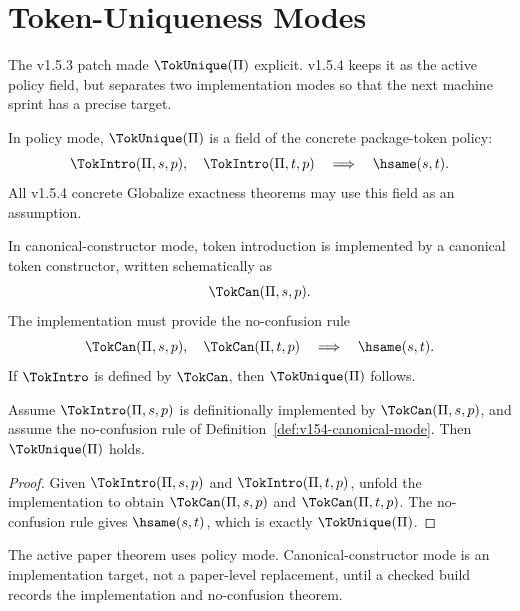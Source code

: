 
\chapter{Token-Uniqueness Modes}
\label{ch:v154-token-uniqueness-modes}

The v1.5.3 patch made \(\TokUnique(\Pi)\) explicit. v1.5.4 keeps it as the active policy field, but separates two implementation modes so that the next machine sprint has a precise target.

\begin{definition}
\label{def:v154-policy-mode}
In policy mode, \(\TokUnique(\Pi)\) is a field of the concrete package-token policy:
\[
  \TokIntro(\Pi,s,p),\quad \TokIntro(\Pi,t,p)
  \quad\Longrightarrow\quad
  \hsame(s,t).
\]
All v1.5.4 concrete Globalize exactness theorems may use this field as an assumption.
\end{definition}

\begin{definition}
\label{def:v154-canonical-mode}
In canonical-constructor mode, token introduction is implemented by a canonical token constructor, written schematically as
\[
  \TokCan(\Pi,s,p).
\]
The implementation must provide the no-confusion rule
\[
  \TokCan(\Pi,s,p),\quad \TokCan(\Pi,t,p)
  \quad\Longrightarrow\quad
  \hsame(s,t).
\]
If \(\TokIntro\) is defined by \(\TokCan\), then \(\TokUnique(\Pi)\) follows.
\end{definition}

\begin{lemma}
\label{lem:v154-canonical-implies-unique}
Assume \(\TokIntro(\Pi,s,p)\) is definitionally implemented by \(\TokCan(\Pi,s,p)\), and assume the no-confusion rule of Definition~\ref{def:v154-canonical-mode}. Then \(\TokUnique(\Pi)\) holds.
\end{lemma}

\begin{proof}
Given \(\TokIntro(\Pi,s,p)\) and \(\TokIntro(\Pi,t,p)\), unfold the implementation to obtain \(\TokCan(\Pi,s,p)\) and \(\TokCan(\Pi,t,p)\). The no-confusion rule gives \(\hsame(s,t)\), which is exactly \(\TokUnique(\Pi)\).
\end{proof}

\begin{principle}
\label{prin:v154-active-token-mode}
The active paper theorem uses policy mode. Canonical-constructor mode is an implementation target, not a paper-level replacement, until a checked build records the implementation and no-confusion theorem.
\end{principle}

